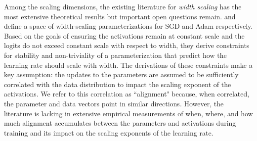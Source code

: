 \documentclass{article}
\theoremstyle{plain}
\theoremstyle{definition}
\theoremstyle{remark}
\begin{document}
Among the scaling dimensions, the existing literature for \emph{width scaling} has the most extensive theoretical results but important open questions remain. \citet{yang2021tensoriv} and \citet{yang2023tensorivb} define a space of width-scaling parameterizations for SGD and Adam respectively. Based on the goals of ensuring the activations remain at constant scale and the logits do not exceed constant scale with respect to width, they derive constraints for stability and non-triviality of a parameterization that predict how the learning rate should scale with width. The derivations of these constraints make a key assumption: the updates to the parameters are assumed to be sufficiently correlated with the data distribution to impact the scaling exponent of the activations. We refer to this correlation as ``alignment" because, when correlated, the parameter and data vectors point in similar directions. However, the literature is lacking in extensive empirical measurements of when, where, and how much alignment accumulates between the parameters and activations during training and its impact on the scaling exponents of the learning rate.
\end{document}
